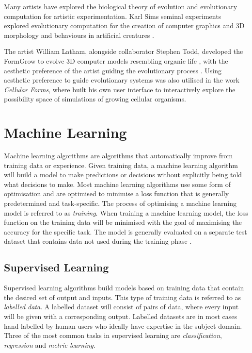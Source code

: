Many artists have explored the biological theory of evolution and evolutionary computation for artistic experimentation.
Karl Sims seminal experiments explored evolutionary computation for the creation of computer graphics \citep{sims1991artificial} and 3D morphology and behaviours in artificial creatures \citep{sims1994evolving, sims2023evolving}.

The artist William Latham, alongside collaborator Stephen Todd, developed the FormGrow to evolve 3D computer models resembling organic life \citep{latham1992evolutionary}, with the aesthetic preference of the artist guiding the evolutionary process \citep{lambert2013emergence}.
Using aesthetic preference to guide evolutionary systems was also utilised in the work \textit{Cellular Forms}, where \cite{lomas2014cellular} built his own user interface to interactively explore the possibility space of simulations of growing cellular organisms.

\section{Machine Learning}
\label{c2:sec:ml}
Machine learning algorithms are algorithms that automatically improve from training data or experience. 
Given training data, a machine learning algorithm will build a model to make predictions or decisions without explicitly being told what decisions to make. 
Most machine learning algorithms use some form of optimisation and are optimised to minimise a loss function that is generally predetermined and task-specific. 
The process of optimising a machine learning model is referred to as \emph{training}. 
When training a machine learning model, the loss function on the training data will be minimised with the goal of maximising the accuracy for the specific task. 
The model is generally evaluated on a separate test dataset that contains data not used during the training phase \citep{murphy2012machine}.

\subsection{Supervised Learning}

Supervised learning algorithms build models based on training data that contain the desired set of output and inputs. 
This type of training data is referred to as \emph{labelled data}. 
A labelled dataset will consist of pairs of data, where every input will be given with a corresponding output. 
Labelled datasets are in most cases hand-labelled by human users who ideally have expertise in the subject domain.  
Three of the most common tasks in supervised learning are \emph{classification}, \emph{regression} and \emph{metric learning}. 


